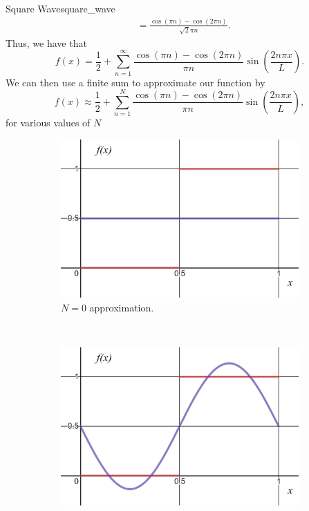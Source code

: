 \begin{ex}{Square Wave}{square_wave}
\begin{align*}
					&= \frac{\cos(\pi n)-\cos(2\pi n)}{\sqrt{2} \pi n}.
		\end{align*}
		Thus, we have that
		\[
		f(x) = \frac{1}{2} + \sum_{n=1}^\infty \frac{\cos(\pi n)-\cos(2\pi n)}{\pi n} \sin\left(\frac{2 n \pi x}{L}\right).
		\]
		We can then use a finite sum to approximate our function by
		\[
		f(x) \approx \frac{1}{2} + \sum_{n=1}^N \frac{\cos(\pi n)-\cos(2\pi n)}{\pi n} \sin\left(\frac{2 n \pi x}{L}\right),
		\]
		for various values of $N$
		\begin{figure}[H]
			\centering
			\begin{subfigure}[h]{0.3\textwidth}
				\includegraphics[width=\textwidth]{Figures_Part_5/N=0.png}
				\caption{$N=0$ approximation.}
			\end{subfigure}
			~ 
			\begin{subfigure}[h]{0.3\textwidth}
				\includegraphics[width=\textwidth]{Figures_Part_5/N=1.png}

\end{subfigure}
\end{figure}
\end{ex}
